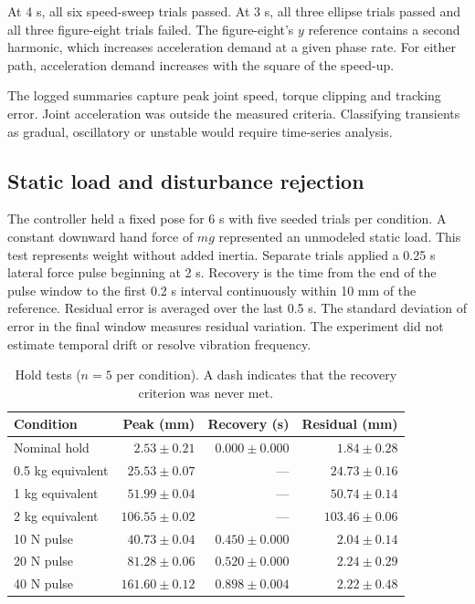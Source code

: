 \documentclass[12pt,a4paper]{article}
\begin{document}
At 4 s, all six speed-sweep trials passed. At 3 s, all three ellipse trials passed and all three figure-eight trials failed. The figure-eight's $y$ reference contains a second harmonic, which increases acceleration demand at a given phase rate. For either path, acceleration demand increases with the square of the speed-up.

The logged summaries capture peak joint speed, torque clipping and tracking error. Joint acceleration was outside the measured criteria. Classifying transients as gradual, oscillatory or unstable would require time-series analysis.

\subsection{Static load and disturbance rejection}
The controller held a fixed pose for 6 s with five seeded trials per condition. A constant downward hand force of $mg$ represented an unmodeled static load. This test represents weight without added inertia. Separate trials applied a 0.25 s lateral force pulse beginning at 2 s. Recovery is the time from the end of the pulse window to the first 0.2 s interval continuously within 10 mm of the reference. Residual error is averaged over the last 0.5 s. The standard deviation of error in the final window measures residual variation. The experiment did not estimate temporal drift or resolve vibration frequency.
\begin{table}[!htbp]
\centering\small
\caption{Hold tests ($n=5$ per condition). A dash indicates that the recovery criterion was never met.}
\begin{tabular}{lrrr}
\toprule
Condition & Peak (mm) & Recovery (s) & Residual (mm)\\
\midrule
Nominal hold & $2.53\pm0.21$ & $0.000\pm0.000$ & $1.84\pm0.28$\\
0.5 kg equivalent & $25.53\pm0.07$ & --- & $24.73\pm0.16$\\
1 kg equivalent & $51.99\pm0.04$ & --- & $50.74\pm0.14$\\
2 kg equivalent & $106.55\pm0.02$ & --- & $103.46\pm0.06$\\
10 N pulse & $40.73\pm0.04$ & $0.450\pm0.000$ & $2.04\pm0.14$\\
20 N pulse & $81.28\pm0.06$ & $0.520\pm0.000$ & $2.24\pm0.29$\\
40 N pulse & $161.60\pm0.12$ & $0.898\pm0.004$ & $2.22\pm0.48$\\
\bottomrule
\end{tabular}
\end{table}
\end{document}

